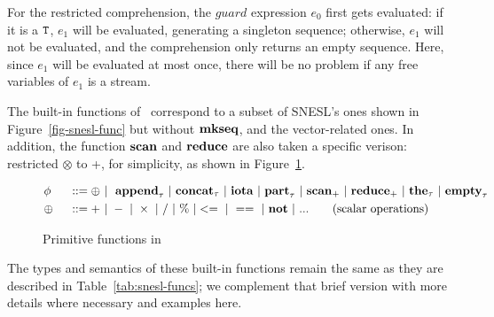 For the restricted comprehension, the $guard$ expression $e_0$ first gets evaluated: if it is a $\mathtt{T}$, $e_1$ will be evaluated, generating a singleton sequence; otherwise, $e_1$ will not be evaluated, and the comprehension only returns an empty sequence. Here, since $e_1$ will be evaluated at most once, there will be no problem if any free variables of $e_1$ is a stream.

The built-in functions of \mysnesl \ correspond to a subset of SNESL's ones shown in Figure~\ref{fig-snesl-func} but without $\mathbf{mkseq}$, and the vector-related ones. 
In addition, the function $\mathbf{scan}$ and $\mathbf{reduce}$ are also
taken a specific verison: restricted $\otimes$ to +, for simplicity, as shown in Figure~\ref{fig-mysnesl-func}. 


\begin{figure}[H]\large
	\begin{alignat*}{2} 
	&\phi && ::= \oplus \ | \  \ \mathbf{append}_{\tau} \ | \ \mathbf{concat}_{\tau}  \ | \ \mathbf{iota}  \ | \ \mathbf{part}_{\tau}  \ | \ \mathbf{scan}_+ \ | \ \mathbf{reduce}_{+} \ | \ \mathbf{the}_{\tau}  \ | \ \mathbf{empty}_{\tau} \\	
	& \oplus  \ && :: = + \ | \ - \ | \ \times \ |  \  / \ | \ \% \ | <= \ | \ == \ | \  \mathbf{not} \ | \ ... \tag{scalar operations} 
	\end{alignat*}
	\caption{Primitive functions in \mysnesl \label{fig-mysnesl-func}}
\end{figure}

The types and semantics of these built-in functions remain the same as they are described in Table~\ref{tab:snesl-funcs}; we complement that brief version with more details where necessary and examples here.

